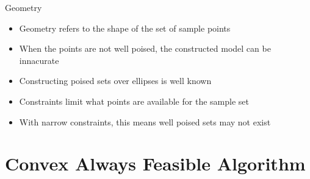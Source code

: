 \documentclass{beamer}
\begin{document}
\begin{frame}{Geometry}
    \begin{itemize}
        \item<1, 2, 3> Geometry refers to the shape of the set of sample points
        \item<1, 2, 3> When the points are not well poised, the constructed model can be innacurate \\
        \item<3> Constructing poised sets over ellipses is well known
        \item<3> Constraints limit what points are available for the sample set
        \item<3> With narrow constraints, this means well poised sets may not exist
    \end{itemize}
\end{frame}





\section{Convex Always Feasible Algorithm}
\end{document}
